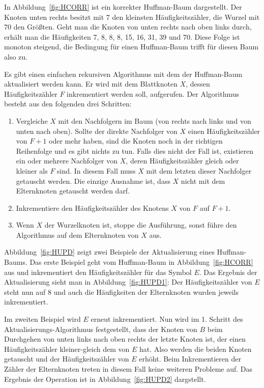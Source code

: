 \documentclass[twoside,11pt,a4paper]{article}
\theoremstyle{break}
\begin{document}
In Abbildung~\ref{fig:HCORR} ist ein korrekter Huffman-Baum
dargestellt. Der Knoten unten rechts besitzt mit 7 den kleinsten
Häufigkeitszähler, die Wurzel mit 70 den Größten. Geht man die Knoten
von unten rechts nach oben links durch, erhält man die Häufigkeiten 7,
8, 8, 8, 15, 16, 31, 39 und 70. Diese Folge ist monoton steigend, die
Bedingung für einen Huffman-Baum trifft für diesen Baum also zu.

Es gibt einen einfachen rekursiven Algorithmus mit dem der
Huffman-Baum aktualisiert werden kann. Er wird mit dem Blattknoten
$X$, dessen Häufigkeitszähler $F$ inkrementiert werden soll,
aufgerufen. Der Algorithmus besteht aus den folgenden drei Schritten:

\begin{enumerate}
\item Vergleiche $X$ mit den Nachfolgern im Baum (von rechts nach
  links und von unten nach oben). Sollte der direkte Nachfolger von
  $X$ einen Häufigkeitszähler von $F+1$ oder mehr haben, sind die
  Knoten noch in der richtigen Reihenfolge und es gibt nichts zu tun.
  Falls dies nicht der Fall ist, existieren ein oder mehrere
  Nachfolger von $X$, deren Häufigkeitszähler gleich oder kleiner als
  $F$ sind. In diesem Fall muss $X$ mit dem letzten dieser Nachfolger
  getauscht werden. Die einzige Ausnahme ist, dass $X$ nicht mit dem
  Elternknoten getauscht werden darf.
\item Inkrementiere den Häufigkeitszähler des Knotens $X$ von $F$ auf
  $F+1$.
\item Wenn $X$ der Wurzelknoten ist, stoppe die Ausführung, sonst
  führe den Algorithmus auf dem Elternknoten von $X$ aus.
\end{enumerate}

Abbildung~\ref{fig:HUPD} zeigt zwei Beispiele der Aktualisierung eines
Huffman-Baums. Das erste Beispiel geht vom Huffman-Baum in
Abbildung~\ref{fig:HCORR} aus und inkrementiert den Häufigkeitszähler
für das Symbol $E$. Das Ergebnis der Aktualisierung sieht man in
Abbildung~\ref{fig:HUPD1}: Der Häufigkeitszähler von $E$ steht nun auf
8 und auch die Häufigkeiten der Elternknoten wurden jeweils
inkrementiert.

Im zweiten Beispiel wird $E$ erneut inkrementiert. Nun wird im
1. Schritt des Aktualisierungs-Algorithmus festgestellt, dass der
Knoten von $B$ beim Durchgehen von unten links nach oben rechts der
letzte Knoten ist, der einen Häufigkeitszähler kleiner-gleich dem von
$E$ hat. Also werden die beiden Knoten getauscht und der
Häufigkeitszähler von $E$ erhöht. Beim Inkrementieren der Zähler der
Elternknoten treten in diesem Fall keine weiteren Probleme auf. Das
Ergebnis der Operation ist in Abbildung~\ref{fig:HUPD2} dargstellt.
\end{document}
